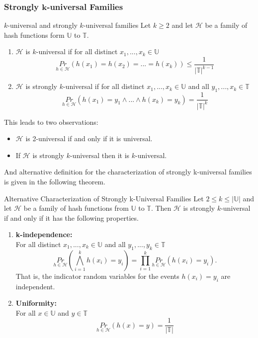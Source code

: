 \documentclass[english]{panikzettel}
\begin{document}
\subsubsection{Strongly $\mathbf{k}$-universal Families}
\begin{defi}{$k$-universal and strongly $k$-universal families}
Let $k\geq 2$ and let $\mathcal{H}$ be a family of hash functions form $\mathbb{U}$ to $\mathbb{T}$.
\begin{enumerate}
\item $\mathcal{H}$ is $k$-universal if for all distinct $x_1,...,x_k\in\mathbb{U}$
\[
\underset{h\in\mathcal{H}}{Pr}(h(x_1)=h(x_2)=...=h(x_k))\leq \frac{1}{|\mathbb{T}|^{k-1}}
\]
\item $\mathcal{H}$ is strongly $k$-universal if for all distinct $x_1,...,x_k\in\mathbb{U}$ and all $y_1,...,x_k\in\mathbb{T}$
\[
\underset{h\in\mathcal{H}}{Pr}(h(x_1)=y_1\wedge...\wedge h(x_k)=y_k)=\frac{1}{|\mathbb{T}|^k}
\]
\end{enumerate}
\end{defi}
This leads to two observations:
\begin{itemize}
\item $\mathcal{H}$ is 2-universal if and only if it is universal.
\item If $\mathcal{H}$ is strongly $k$-universal then it is $k$-universal.
\end{itemize}

And alternative definition for the characterization of
strongly k-universal families is given in the following theorem.

\begin{theo}{Alternative Characterization of Strongly k-Universal Families}
Let $2\leq k\leq |\mathbb{U}|$ and let $\mathcal{H}$ be a family of hash functions from $\mathbb{U}$ to $\mathbb{T}$. Then $\mathcal{H}$ is strongly $k$-universal if and only if it has the following properties.
\begin{enumerate}
\item \textbf{k-independence:}\\
For all distinct $x_1,...,x_k\in\mathbb{U}$ and all $y_1,...,y_k\in\mathbb{T}$
\[
\underset{h\in\mathcal{H}}{Pr}\left( \bigwedge_{i=1}^k h(x_i)=y_i \right) = \prod_{i=1}^k \underset{h\in\mathcal{H}}{Pr}(h(x_i)=y_i).
\]
That is, the indicator random variables for the events
$h(x_i)=y_i$ are independent.
\item \textbf{Uniformity:}\\
For all $x\in\mathbb{U}$ and $y\in\mathbb{T}$
\[
\underset{h\in\mathcal{H}}{Pr} (h(x)=y)=\frac{1}{|\mathbb{T}|}
\]
\end{enumerate}
\end{theo}
\end{document}
